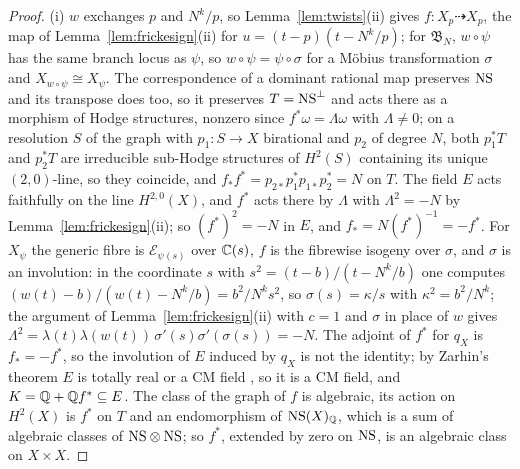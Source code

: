 \begin{proof}
(i) $w$ exchanges $p$ and $N^{k}/p$, so Lemma~\ref{lem:twists}(ii) gives $f\colon X_{p}\dashrightarrow X_{p}$, the map of Lemma~\ref{lem:frickesign}(ii) for $u=(t-p)(t-N^{k}/p)$; for $\mathfrak{B}_{N}$, $w\circ\psi$ has the same branch locus as $\psi$, so $w\circ\psi=\psi\circ\sigma$ for a M\"obius transformation $\sigma$ and $X_{w\circ\psi}\cong X_{\psi}$. The correspondence of a dominant rational map preserves $\mathrm{NS}$ and its transpose does too, so it preserves $T=\mathrm{NS}^{\perp}$ and acts there as a morphism of Hodge structures, nonzero since $f^{*}\omega=\Lambda\omega$ with $\Lambda\ne0$; on a resolution $S$ of the graph with $p_{1}\colon S\to X$ birational and $p_{2}$ of degree $N$, both $p_{1}^{*}T$ and $p_{2}^{*}T$ are irreducible sub-Hodge structures of $H^{2}(S)$ containing its unique $(2,0)$-line, so they coincide, and $f_{*}f^{*}=p_{2*}p_{1}^{*}p_{1*}p_{2}^{*}=N$ on $T$. The field $E$ acts faithfully on the line $H^{2,0}(X)$, and $f^{*}$ acts there by $\Lambda$ with $\Lambda^{2}=-N$ by Lemma~\ref{lem:frickesign}(ii); so $(f^{*})^{2}=-N$ in $E$, and $f_{*}=N(f^{*})^{-1}=-f^{*}$. For $X_{\psi}$ the generic fibre is $\mathcal{E}_{\psi(s)}$ over $\mathbb{C}(s)$, $f$ is the fibrewise isogeny over $\sigma$, and $\sigma$ is an involution: in the coordinate $s$ with $s^{2}=(t-b)/(t-N^{k}/b)$ one computes $(w(t)-b)/(w(t)-N^{k}/b)=b^{2}/N^{k}s^{2}$, so $\sigma(s)=\kappa/s$ with $\kappa^{2}=b^{2}/N^{k}$; the argument of Lemma~\ref{lem:frickesign}(ii) with $c=1$ and $\sigma$ in place of $w$ gives $\Lambda^{2}=\lambda(t)\lambda(w(t))\,\sigma'(s)\sigma'(\sigma(s))=-N$. The adjoint of $f^{*}$ for $q_{X}$ is $f_{*}=-f^{*}$, so the involution of $E$ induced by $q_{X}$ is not the identity; by Zarhin's theorem $E$ is totally real or a CM field \cite[Thm.~1.5.1]{Zar83}, so it is a CM field, and $K=\mathbb{Q}+\mathbb{Q} f^{*}\subseteq E$. The class of the graph of $f$ is algebraic, its action on $H^{2}(X)$ is $f^{*}$ on $T$ and an endomorphism of $\mathrm{NS}(X)_{\mathbb{Q}}$, which is a sum of algebraic classes of $\mathrm{NS}\otimes\mathrm{NS}$; so $f^{*}$, extended by zero on $\mathrm{NS}$, is an algebraic class on $X\times X$.


\end{proof}
